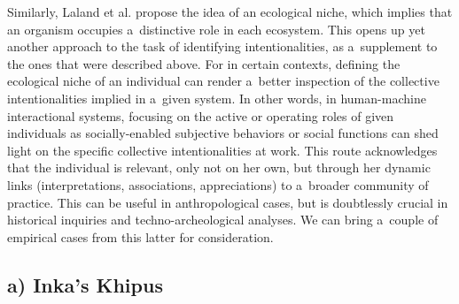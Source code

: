 Similarly, Laland et al.
\parencite*[][]{laland_niche_2000} %
 propose the idea of an ecological niche, which implies that an organism occupies a~distinctive role in each ecosystem. This opens up yet another approach to the task of identifying intentionalities, as a~supplement to the ones that were described above. For in certain contexts, defining the ecological niche of an individual can render a~better inspection of the collective intentionalities implied in a~given system. In other words, in human-machine interactional systems, focusing on the active or operating roles of given individuals as socially-enabled subjective behaviors or social functions can shed light on the specific collective intentionalities at work. This route acknowledges that the individual is relevant, only not on her own, but through her dynamic links (interpretations, associations, appreciations) to a~broader community of practice. This can be useful in anthropological cases, but is doubtlessly crucial in historical inquiries and techno-archeological analyses. We can bring a~couple of empirical cases from this latter for consideration.

\subsection*{a) Inka's Khipus}


